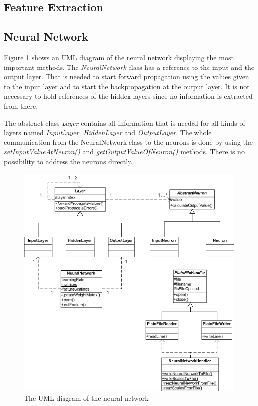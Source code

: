 \subsection{Feature Extraction}

\subsection{Neural Network}

Figure \ref{uml_wids} shows an UML diagram of the neural network displaying the most important methods. The {\em NeuralNetwork} class has a reference to the input and the output layer. That is needed to start forward propagation using the values given to the input layer and to start the backpropagation at the output layer. It is not necessary to hold references of the hidden layers since no information is extracted from there.

The abstract class {\em Layer} contains all information that is needed for all kinds of layers named {\em InputLayer}, {\em HiddenLayer} and {\em OutputLayer}. The whole communication from the NeuralNetwork class to the neurons is done by using the {\em setInputValueAtNeuron()} and {\em getOutputValueOfNeuron()} methods. There is no possibility to address the neurons directly.

\begin{figure}[htbp]
	\begin{center}
		\includegraphics[width=1.0\columnwidth]{graphics/UML_WIDS}
	\end{center}
		
	\caption{The UML diagram of the neural network}
	\label{uml_wids}
\end{figure}

